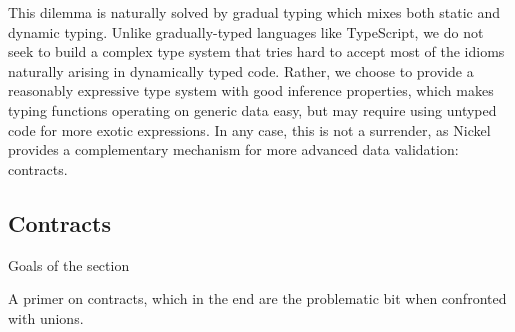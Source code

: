 \documentclass[sigplan,10pt,review,anonymous]{acmart}
\newcommand{\unsure}[2][1=]{}
\begin{document}
This dilemma is naturally solved by gradual typing\cite{Siek06gradualtyping}
which mixes both static and dynamic typing. Unlike gradually-typed languages
like TypeScript\unsure{Todo: explain that typescript uses unions as static
typing whereas we are speaking of dynamic contracts}, we do not seek to build a
complex type system that tries hard to accept most of the idioms naturally
arising in dynamically typed code.  Rather, we choose to provide a reasonably
expressive type system with good inference properties, which makes typing
functions operating on generic data easy, but may require using untyped code for
more exotic expressions.  In any case, this is not a surrender, as Nickel
provides a complementary mechanism for more advanced data validation: contracts.

\subsection{Contracts}
{\color{red}Goals of the section

A primer on contracts, which in the end are the problematic bit when confronted
with unions.\vspace{0.5cm}}
\end{document}
